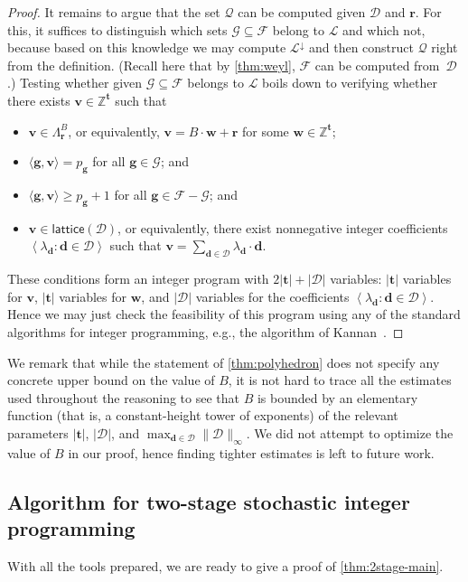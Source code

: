 \documentclass{article}
\renewcommand{\geq}{\geqslant}
\newcommand{\Dd}{\mathcal{D}}
\newcommand{\Z}{\mathbb{Z}}
\newcommand{\tup}[1]{{\mathbf{#1}}}
\newcommand{\ww}{\tup w}
\newcommand{\tv}{\tup t}
\renewcommand{\gg}{\tup g}
\newcommand{\rr}{\tup r}
\newcommand{\dd}{\tup d}
\newcommand{\myvv}{\tup v} %
\newcommand{\mset}[1]{\left\langle #1\right\rangle}
\newcommand{\Qq}{\mathcal{Q}}
\newcommand{\Ff}{\mathcal{F}}
\newcommand{\Gg}{\mathcal{G}}
\newcommand{\Ss}{\mathscr{L}}
\newcommand{\sca}[2]{\langle #1,#2\rangle}
\renewcommand{\setminus}{-}
\newcommand{\lattice}{\mathsf{lattice}}
\begin{document}
\begin{proof}
\medskip

It remains to argue that the set $\Qq$ can be computed given $\Dd$ and $\rr$. For this, it suffices to distinguish which sets $\Gg\subseteq \Ff$ belong to $\Ss$ and which not, because based on this knowledge we may compute $\Ss^{\downarrow}$ and then construct $\Qq$ right from the definition. (Recall here that by \cref{thm:weyl}, $\Ff$ can be computed from~$\Dd$.) Testing whether given $\Gg\subseteq \Ff$ belongs to $\Ss$ boils down to verifying whether there exists $\myvv\in \Z^\tv$ such that
\begin{itemize}[nosep]
 \item $\myvv\in \Lambda_\rr^B$, or equivalently, $\myvv=B\cdot \ww+\rr$ for some $\ww\in \Z^\tv$;
 \item $\sca{\gg}{\myvv}=p_\gg$ for all $\gg\in \Gg$; and
 \item $\sca{\gg}{\myvv}\geq p_\gg+1$ for all $\gg\in \Ff\setminus \Gg$; and
 \item $\myvv\in \lattice(\Dd)$, or equivalently, there exist nonnegative integer coefficients $\mset{\lambda_\dd\colon \dd\in \Dd}$ such that $\myvv=\sum_{\dd\in \Dd} \lambda_\dd\cdot \dd$.
\end{itemize}
These conditions form an integer program with $2|\tv|+|\Dd|$ variables: $|\tv|$ variables for $\myvv$, $|\tv|$ variables for $\ww$, and $|\Dd|$ variables for the coefficients $\mset{\lambda_\dd\colon \dd\in \Dd}$. Hence we may just check the feasibility of this program using any of the standard algorithms for integer programming, e.g., the algorithm of Kannan~\cite{kannan1987minkowski}.
\end{proof}

We remark that while the statement of \cref{thm:polyhedron} does not specify any concrete upper bound on the value of $B$, it is not hard to trace all the estimates used throughout the reasoning to see that $B$ is bounded by an elementary function (that is, a constant-height tower of exponents) of the relevant parameters $|\tv|$, $|\Dd|$, and $\max_{\dd\in \Dd}\|\Dd\|_\infty$. We did not attempt to optimize the value of $B$ in our proof, hence finding tighter estimates is left to future work.

\subsection{Algorithm for two-stage stochastic integer programming}

With all the tools prepared, we are ready to give a proof of \cref{thm:2stage-main}.
\end{document}
